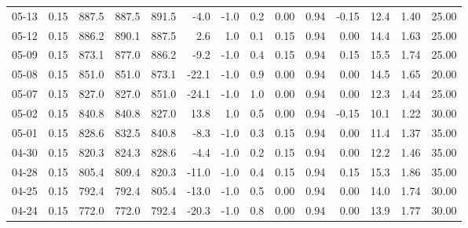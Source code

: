 \begin{threeparttable}
{\begin{tabular}{lrrrrrrrrrrrrr}
  05-13 &     0.15 & 887.5 & 887.5 & 891.5 &       -4.0 &                     -1.0 &                 0.2 &       0.00 &      0.94 &          -0.15 &             12.4 &            1.40 &                  25.00 \\
  05-12 &     0.15 & 886.2 & 890.1 & 887.5 &        2.6 &                      1.0 &                 0.1 &       0.15 &      0.94 &           0.00 &             14.4 &            1.63 &                  25.00 \\
  05-09 &     0.15 & 873.1 & 877.0 & 886.2 &       -9.2 &                     -1.0 &                 0.4 &       0.15 &      0.94 &           0.15 &             15.5 &            1.74 &                  25.00 \\
  05-08 &     0.15 & 851.0 & 851.0 & 873.1 &      -22.1 &                     -1.0 &                 0.9 &       0.00 &      0.94 &           0.00 &             14.5 &            1.65 &                  20.00 \\
  05-07 &     0.15 & 827.0 & 827.0 & 851.0 &      -24.1 &                     -1.0 &                 1.0 &       0.00 &      0.94 &           0.00 &             12.3 &            1.44 &                  25.00 \\
  05-02 &     0.15 & 840.8 & 840.8 & 827.0 &       13.8 &                      1.0 &                 0.5 &       0.00 &      0.94 &          -0.15 &             10.1 &            1.22 &                  30.00 \\
  05-01 &     0.15 & 828.6 & 832.5 & 840.8 &       -8.3 &                     -1.0 &                 0.3 &       0.15 &      0.94 &           0.00 &             11.4 &            1.37 &                  35.00 \\
  04-30 &     0.15 & 820.3 & 824.3 & 828.6 &       -4.4 &                     -1.0 &                 0.2 &       0.15 &      0.94 &           0.00 &             12.2 &            1.46 &                  35.00 \\
  04-28 &     0.15 & 805.4 & 809.4 & 820.3 &      -11.0 &                     -1.0 &                 0.4 &       0.15 &      0.94 &           0.15 &             15.3 &            1.86 &                  35.00 \\
  04-25 &     0.15 & 792.4 & 792.4 & 805.4 &      -13.0 &                     -1.0 &                 0.5 &       0.00 &      0.94 &           0.00 &             14.0 &            1.74 &                  30.00 \\
  04-24 &     0.15 & 772.0 & 772.0 & 792.4 &      -20.3 &                     -1.0 &                 0.8 &       0.00 &      0.94 &           0.00 &             13.9 &            1.77 &                  30.00 \\

\end{tabular}}
\end{threeparttable}
